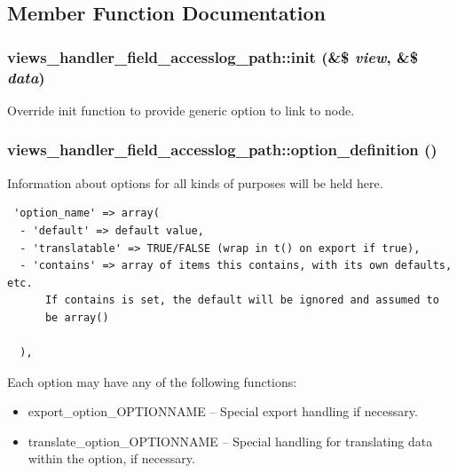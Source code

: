 \subsection{Member Function Documentation}
\hypertarget{classviews__handler__field__accesslog__path_6b5a912fcf95a0f2f26d823be47d760e}{
\subsubsection[{init}]{\setlength{\rightskip}{0pt plus 5cm}views\_\-handler\_\-field\_\-accesslog\_\-path::init (\&\$ {\em view}, \/  \&\$ {\em data})}}
\label{classviews__handler__field__accesslog__path_6b5a912fcf95a0f2f26d823be47d760e}


Override init function to provide generic option to link to node. \hypertarget{classviews__handler__field__accesslog__path_11c091160e8e55c604aeb1241581f748}{
\subsubsection[{option\_\-definition}]{\setlength{\rightskip}{0pt plus 5cm}views\_\-handler\_\-field\_\-accesslog\_\-path::option\_\-definition ()}}
\label{classviews__handler__field__accesslog__path_11c091160e8e55c604aeb1241581f748}


Information about options for all kinds of purposes will be held here. 

\begin{Code}\begin{verbatim} 'option_name' => array(
  - 'default' => default value,
  - 'translatable' => TRUE/FALSE (wrap in t() on export if true),
  - 'contains' => array of items this contains, with its own defaults, etc.
      If contains is set, the default will be ignored and assumed to
      be array()

  ),
\end{verbatim}
\end{Code}

 Each option may have any of the following functions:\begin{itemize}
\item export\_\-option\_\-OPTIONNAME -- Special export handling if necessary.\item translate\_\-option\_\-OPTIONNAME -- Special handling for translating data within the option, if necessary. \end{itemize}


